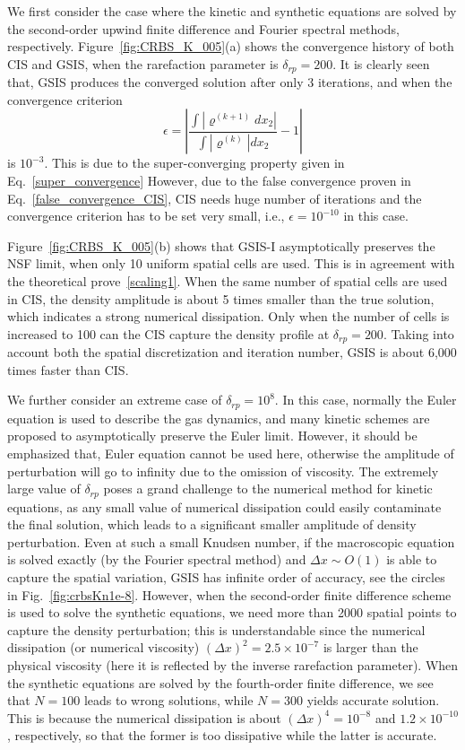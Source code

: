 We first consider the case where the kinetic and synthetic equations are solved by the second-order upwind finite difference and Fourier spectral methods, respectively. Figure~\ref{fig:CRBS_K_005}(a) shows the convergence history of both CIS and GSIS, when the rarefaction parameter is $\delta_{rp}=200$. It is clearly seen that, GSIS produces the converged solution after only 3 iterations, and when the convergence criterion 
\begin{equation}
\epsilon=\left|\frac{\int|\varrho^{(k+1)}dx_2|}{\int|\varrho^{(k)}|dx_2}-1\right|
\end{equation}
is $10^{-3}$. This is due to the super-converging property given in Eq.~\eqref{super_convergence}
However, due to the false convergence proven in Eq.~\eqref{false_convergence_CIS}, CIS needs huge number of iterations and the convergence criterion has to be set very small, i.e., $\epsilon=10^{-10}$ in this case. 


Figure~\ref{fig:CRBS_K_005}(b) shows that GSIS-I  asymptotically preserves the NSF limit, when only 10 uniform spatial cells are used. This is in agreement with the theoretical prove~\eqref{scaling1}. When the same number of spatial cells are used in CIS, the density amplitude is about 5 times smaller than the true solution, which indicates a strong numerical dissipation. Only when the number of cells is increased to 100 can the CIS capture the density profile at $\delta_{rp}=200$. Taking into account both the spatial discretization and iteration number, GSIS is about 6,000 times faster than CIS. 


We further consider an extreme case of $\delta_{rp}=10^{8}$. In this case, normally the Euler equation is used to describe the gas dynamics, and many kinetic schemes are proposed to asymptotically preserve the Euler limit. However, it should be emphasized that, Euler equation cannot be used here, otherwise the amplitude of perturbation will go to infinity due to the omission of viscosity. The extremely large value of $\delta_{rp}$ poses a grand challenge to the numerical method for kinetic equations, as any small value of numerical dissipation could easily contaminate the final solution, which leads to a significant smaller amplitude of density perturbation. Even at such a small Knudsen number, if the macroscopic equation is solved exactly (by the Fourier spectral method) and $\Delta{x}\sim{O(1)}$ is able to capture the spatial variation, GSIS has infinite order of accuracy, see the circles in Fig.~\ref{fig:crbsKn1e-8}. However, when the second-order finite difference scheme is used to solve the synthetic equations, we need more than 2000 spatial points to capture the density perturbation; this is understandable since the numerical dissipation (or numerical viscosity) $(\Delta{x})^2=2.5\times10^{-7}$ is larger than the physical viscosity (here it is reflected by the inverse rarefaction parameter). When the synthetic equations are solved by the fourth-order finite difference, we see that $N=100$ leads to wrong solutions, while $N=300$ yields accurate solution. This is because the numerical dissipation is about $(\Delta{x})^4=10^{-8}$ and $1.2\times10^{-10}$, respectively, so that the former is too dissipative while the latter is accurate.   

